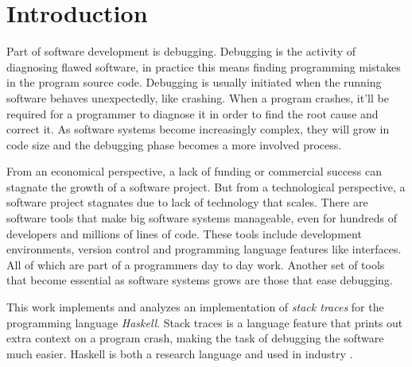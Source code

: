 \chapter{Introduction}

Part of software development is debugging. Debugging is the activity of
diagnosing flawed software, in practice this means finding programming mistakes
in the program source code. Debugging is usually initiated when the running
software behaves unexpectedly, like crashing. When a program crashes, it'll be
required for a programmer to diagnose it in order to find the root cause and
correct it. As software systems become increasingly complex, they will grow in
code size and the debugging phase becomes a more involved process.

From an economical perspective, a lack of funding or commercial success can
stagnate the growth of a software project. But from a technological perspective, a
software project stagnates due to lack of technology that scales. There are
software tools that make big software systems manageable, even for
hundreds of developers and millions of lines of code. These tools include
development environments, version control and programming language features
like interfaces. All of which are part of a programmers day to day work.
Another set of tools that become essential as software systems grows are those
that ease debugging.

This work implements and analyzes an implementation of \emph{stack traces} for
the programming language \emph{Haskell}. Stack traces is a language feature
that prints out extra context on a program crash, making the task of debugging
the software much easier. Haskell is both a research language
\cite{haskell_org_research_papers, dagit_getting_started_with_ghc_hacking}
and used in industry \cite{haskell_in_industry, fpcomplete_case_studies}.
